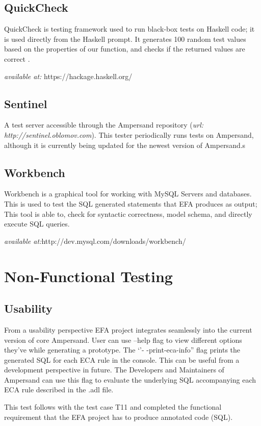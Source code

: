 \documentclass[12pt, svgnames]{article}
\begin{document}
\subsection*{QuickCheck}
QuickCheck is testing framework used to run black-box tests on Haskell code; it 
is used directly from the Haskell prompt. It generates 100 random test values 
based on the properties of our function, and checks if the returned values are 
correct \cite{rwhaskell}.

\textit{available at:} https://hackage.haskell.org/
\subsection*{Sentinel}
A test server accessible through the Ampersand repository (\textit{url: 
http://sentinel.oblomov.com}). This tester periodically runs tests on 
Ampersand, although it is currently being updated for the newest version of 
Ampersand.s

\subsection{Workbench}
Workbench is a graphical tool for working with MySQL Servers and databases. 
This is used to test the SQL generated statements that EFA produces as output; 
This tool is able to, check for syntactic correctness, model schema, and 
directly execute SQL queries.

\textit{available at:}http://dev.mysql.com/downloads/workbench/ 
\section{Non-Functional Testing}

\subsection{Usability}
From a usability perspective EFA project integrates seamlessly into the current version of core Ampersand. User can use --help flag to view different options they've while generating a prototype. The `'- -print-eca-info'' flag prints the generated SQL for each ECA rule in the console. This can be useful from a development perspective in future. The Developers and Maintainers of Ampersand can use this flag to evaluate the underlying SQL accompanying each ECA rule described in the .adl file.

This test follows with the test case T11 and completed the functional requirement that the EFA project has to produce annotated code (SQL).
\end{document}
